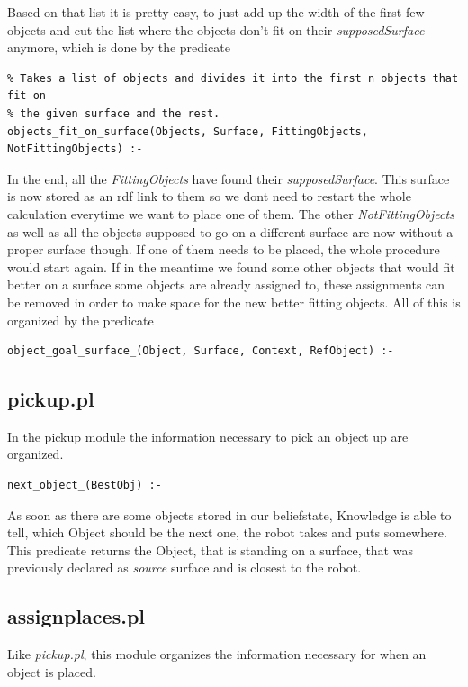 \documentclass[main.tex]{subfiles}
\begin{document}
Based on that list it is pretty easy, to just add up the width of the first few objects and cut the list where the objects don't fit on their \textit{supposedSurface} anymore, which is done by the predicate
\begin{lstlisting}
% Takes a list of objects and divides it into the first n objects that fit on
% the given surface and the rest.
objects_fit_on_surface(Objects, Surface, FittingObjects, NotFittingObjects) :-
\end{lstlisting}

In the end, all the \textit{FittingObjects} have found their \textit{supposedSurface}. This surface is now stored as an rdf link to them so we dont need to restart the whole calculation everytime we want to place one of them. The other \textit{NotFittingObjects} as well as all the objects supposed to go on a different surface are now without a proper surface though. If one of them needs to be placed, the whole procedure would start again. If in the meantime we found some other objects that would fit better on a surface some objects are already assigned to, these assignments can be removed in order to make space for the new better fitting objects. All of this is organized by the predicate 
\begin{lstlisting}
object_goal_surface_(Object, Surface, Context, RefObject) :-
\end{lstlisting}

\subsection{pickup.pl}\label{sec:kn_pickup}

In the pickup module the information necessary to pick an object up are organized.

\begin{lstlisting}
next_object_(BestObj) :-
\end{lstlisting}
As soon as there are some objects stored in our beliefstate, Knowledge is able to tell, which Object should be the next one, the robot takes and puts somewhere. This predicate returns the Object, that is standing on a surface, that was previously declared as \textit{source} surface and is closest to the robot.

\subsection{assignplaces.pl}

Like \textit{pickup.pl}, this module organizes the information necessary for when an object is placed.\\
\end{document}
